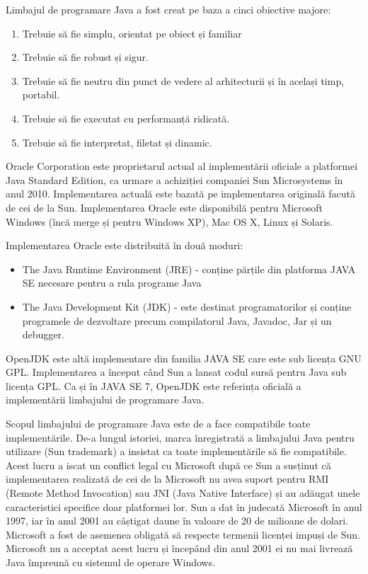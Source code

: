 \documentclass[12pt]{book}
\begin{document}
Limbajul de programare Java a fost creat pe baza a cinci obiective majore:
\begin{addmargin}[4em]{1em}
\begin{enumerate}
	\item Trebuie să fie simplu, orientat pe obiect și familiar		
	\item Trebuie să fie robust și sigur.
	\item Trebuie să fie neutru din punct de vedere al arhitecturii și în același timp, portabil.
	\item Trebuie să fie executat cu performanță ridicată.
	\item Trebuie să fie interpretat, filetat și dinamic. 
\end{enumerate}
\end{addmargin}
\bigbreak
Oracle Corporation este proprietarul actual al implementării oficiale a platformei Java Standard Edition, ca urmare a achiziției companiei Sun Microsystems în anul 2010. Implementarea actuală este bazată pe implementarea originală facută de cei de la Sun. Implementarea Oracle este disponibilă pentru Microsoft Windows (încă merge și pentru Windows XP), Mac OS X, Linux și Solaris. 
	
Implementarea Oracle este distribuită în două moduri:
\begin{addmargin}[4em]{1em}
\begin{itemize}
\item The Java Runtime Environment (JRE) - conține părțile din platforma JAVA SE necesare pentru a rula programe Java 
\item The Java Development Kit (JDK) - este destinat programatorilor și conține programele de dezvoltare precum compilatorul Java, Javadoc, Jar și un debugger.\cite{JavaWiki}	
\end{itemize}
\end{addmargin}
\bigbreak
OpenJDK este altă implementare din familia JAVA SE care este sub licența GNU GPL. Implementarea a început când Sun a lansat codul sursă pentru Java sub licența GPL. Ca și în JAVA SE 7, OpenJDK este referința oficială a implementării limbajului de programare Java.

Scopul limbajului de programare Java este de a face compatibile toate implementările. De-a lungul istoriei, marca înregistrată a limbajului Java pentru utilizare (Sun trademark) a insistat ca toate implementările să fie compatibile. Acest lucru a iscat un conflict legal cu Microsoft după ce Sun a susținut că implementarea realizată de cei de la Microsoft nu avea suport pentru RMI (Remote Method Invocation) sau JNI (Java Native Interface) și au adăugat unele caracteristici specifice doar platformei lor. Sun a dat în judecată Microsoft în anul 1997, iar în anul 2001 au câștigat daune în valoare de 20 de milioane de dolari. Microsoft a fost de asemenea obligată să respecte termenii licenței impuși de Sun. Microsoft nu a acceptat acest lucru și începând din anul 2001 ei nu mai livrează Java împreună cu sistemul de operare Windows.
\end{document}
